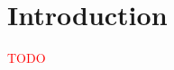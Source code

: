 \documentclass[thesis.tex]{subfiles}
\begin{document}
\chapter{Introduction}
\textcolor{red}{TODO}
\end{document}
